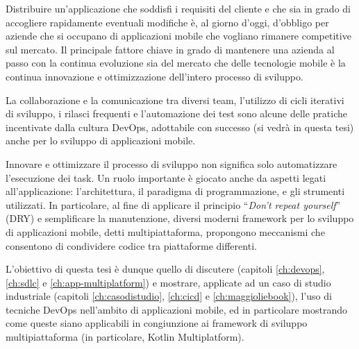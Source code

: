 
Distribuire un'applicazione che soddisfi i requisiti del cliente e che sia in grado di accogliere rapidamente eventuali modifiche è, 
al giorno d’oggi, 
d'obbligo per aziende che si occupano di applicazioni mobile che vogliano rimanere competitive sul mercato.
Il principale fattore chiave in grado di mantenere una azienda al passo con la continua evoluzione sia del mercato che delle tecnologie mobile è la continua innovazione e ottimizzazione dell'intero processo di sviluppo.

La collaborazione e la comunicazione tra diversi team, 
l'utilizzo di cicli iterativi di sviluppo, 
i rilasci frequenti e l'automazione dei test sono alcune delle pratiche incentivate dalla cultura DevOps, 
adottabile con successo (si vedrà in questa tesi) anche per lo sviluppo di applicazioni mobile.

Innovare e ottimizzare il processo di sviluppo non significa solo automatizzare l'esecuzione dei task.
Un ruolo importante è giocato anche da aspetti legati all'applicazione:
l'architettura,
il paradigma di programmazione,
e gli strumenti utilizzati.
In particolare,
al fine di applicare il principio ``\textit{Don't repeat yourself}'' (DRY) e semplificare la manutenzione,
diversi moderni framework per lo sviluppo di applicazioni mobile,
detti multipiattaforma, 
propongono meccanismi che consentono di condividere codice tra piattaforme differenti.

L'obiettivo di questa tesi è dunque quello di discutere
(capitoli \ref{ch:devops}, \ref{ch:sdlc} e \ref{ch:app-multiplatform})
e mostrare, applicate ad un caso di studio industriale
(capitoli \ref{ch:casodistudio}, \ref{ch:cicd} e \ref{ch:maggioliebook}),
l'uso di tecniche DevOps
nell'ambito di applicazioni mobile,
ed in particolare mostrando come queste siano applicabili in congiunzione
ai framework di sviluppo multipiattaforma (in particolare, Kotlin Multiplatform).
